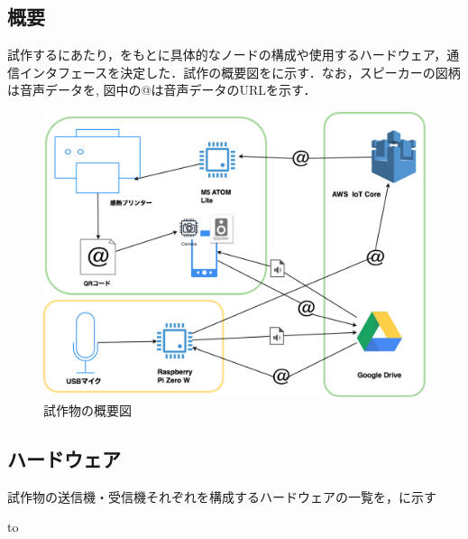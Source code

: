 \documentclass[submit,techrep,noauthor]{ipsj}
\begin{document}
\subsection{概要}
試作するにあたり，をもとに具体的なノードの構成や使用するハードウェア，通信インタフェースを決定した．試作の概要図をに示す．なお，スピーカーの図柄は音声データを,
図中の@は音声データのURLを示す．
\begin{figure}[tb]
\includegraphics[scale=0.2,bb= 0 0 2000 1000]{image/proto_drawio.png}
\caption{試作物の概要図}
\label{fig:proto-overview}
\end{figure}

\subsection{ハードウェア}
試作物の送信機・受信機それぞれを構成するハードウェアの一覧を，に示す

\begin{table}[tb] 
\caption{試作物のハードウェア一覧} 
\label{tab:proto-hardwares}
\hbox to
\end{table}
\end{document}
